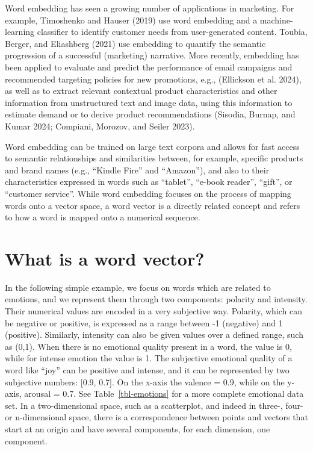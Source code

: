 Word embedding has seen a growing number of applications in marketing.
For example, Timoshenko and Hauser (2019) use word embedding and a
machine-learning classifier to identify customer needs from
user-generated content. Toubia, Berger, and Eliashberg (2021) use
embedding to quantify the semantic progression of a successful
(marketing) narrative. More recently, embedding has been applied to
evaluate and predict the performance of email campaigns and
recommended targeting policies for new promotions, e.g., (Ellickson et al.
2024), as well as to extract relevant contextual product characteristics and
other information from unstructured text and image data, using this
information to estimate demand or to derive product recommendations
(Sisodia, Burnap, and Kumar 2024; Compiani, Morozov, and Seiler 2023).

Word embedding can be trained on large text corpora and allows for fast
access to semantic relationships and similarities between, for example,
specific products and brand names (e.g., ``Kindle Fire'' and
``Amazon''), and also to their characteristics expressed in
words such as ``tablet'', ``e-book reader'', ``gift'', or ``customer
service''. While word embedding focuses on the process of mapping words
onto a vector space, a word vector is a directly related concept and
refers to how a word is mapped onto a numerical sequence.

\section{What is a word vector?}\label{what-is-a-word-vector}

In the following simple example, we focus on words which are related to
emotions, and we represent them through two components: polarity and
intensity. Their numerical values are encoded in a very subjective way.
Polarity, which can be negative or positive, is expressed as a range
between -1 (negative) and 1 (positive). Similarly, intensity can also
be given values over a defined range, such as (0,1). When there is no
emotional quality present in a word, the value is 0, while for intense
emotion the value is 1. The subjective emotional quality of
a word like ``joy'' can be positive and intense, and it can be
represented by two subjective numbers: {[}0.9, 0.7{]}. On the x-axis the
valence = 0.9, while on the y-axis, arousal = 0.7. See
Table~\ref{tbl-emotions} for a more complete emotional data set. In a
two-dimensional space, such as a scatterplot, and indeed in three-, four- or
n-dimensional space, there is a correspondence between points and
vectors that start at an origin and have several components, for each
dimension, one component.

